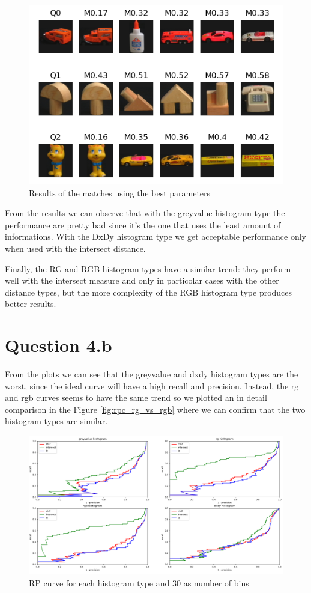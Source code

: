 \documentclass{article}
\begin{document}
\begin{figure}[h!]
\centering
\includegraphics[width=.7\textwidth]{best_match}
\caption{Results of the matches using the best parameters}
\label{fig:best-match}
\end{figure}

From the results we can observe that with the greyvalue histogram type the performance are pretty bad since it's the one that uses the least amount of informations.
With the DxDy histogram type we get acceptable performance only when used with the intersect distance.

Finally, the RG and RGB histogram types have a similar trend: they perform well with the  intersect measure and only in particolar cases with the other distance types, but the more complexity of the RGB histogram type produces better results.

\section*{Question 4.b}

From the plots we can see that the greyvalue and dxdy histogram types are the worst, since the ideal curve will have a high recall and precision.
Instead, the rg and rgb curves seems to have the same trend so we plotted an in detail comparison in the Figure \ref{fig:rpc_rg_vs_rgb} where we can confirm that the two histogram types are similar.

\begin{figure}[ht]
\centering
\includegraphics[width=\textwidth]{rpc_all}
\caption{RP curve for each histogram type and 30 as number of bins}
\label{fig:rpc_all}
\end{figure}
\end{document}
